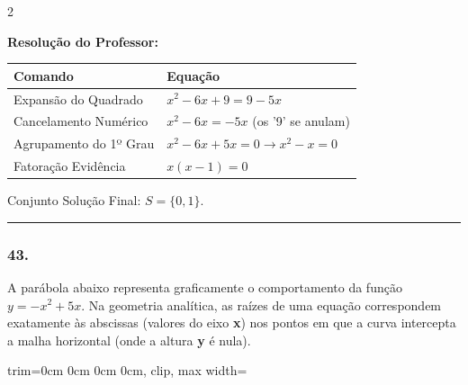 \begin{multicols*}{2}
\ifgabarito
    \begin{tcolorbox}[colback=CorTitUm!5, colframe=CorTitUm, boxrule=1pt, arc=4pt, left=6pt, right=6pt, top=6pt, bottom=6pt]
    \small\textbf{\textcolor{CorTitUm}{Resolução do Professor:}}\par\vspace{0.1cm}
    \color{CinzaEscuro}
    \begin{center}
    \begin{tabular}{|l|l|}
    \hline
    \textbf{Comando} & \textbf{Equação} \\
    \hline
    Expansão do Quadrado & $x^2 - 6x + 9 = 9 - 5x$ \\
    \hline
    Cancelamento Numérico & $x^2 - 6x = -5x$ (os '9' se anulam) \\
    \hline
    Agrupamento do 1º Grau & $x^2 - 6x + 5x = 0 \rightarrow x^2 - x = 0$ \\
    \hline
    Fatoração Evidência & $x(x - 1) = 0$ \\
    \hline
    \end{tabular}
    \end{center}
    \vspace{0.1cm}
    Conjunto Solução Final: $S = \{0, 1\}$.
    \end{tcolorbox}
\fi

\par\vspace{\espacoQuestao}

\noindent\textcolor{CorLinha}{\rule{\linewidth}{0.5pt}} 
\par\vspace{\espacoPreQuestao}
\subsubsection*{43.} A parábola abaixo representa graficamente o comportamento da função $ y = -x^2 + 5x $. Na geometria analítica, as raízes de uma equação correspondem exatamente às abscissas (valores do eixo \textbf{x}) nos pontos em que a curva intercepta a malha horizontal (onde a altura \textbf{y} é nula).

\begin{center}
\begin{adjustbox}{trim=0cm 0cm 0cm 0cm, clip, max width=\larguraTikz}
\end{adjustbox}
\end{center}
\end{multicols*}
